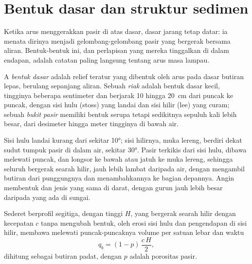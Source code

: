\section{Bentuk dasar dan struktur sedimen}\label{sec:b1:clastic-sediments:bedforms}

Ketika arus menggerakkan pasir di atas dasar, dasar jarang tetap datar: ia menata dirinya menjadi gelombang-gelombang pasir yang bergerak bersama aliran. Bentuk-bentuk ini, dan perlapisan yang mereka tinggalkan di dalam endapan, adalah catatan paling langsung tentang arus masa lampau.

\begin{definition}\label{def:b1:clastic-sediments:bedform}
A \emph{bentuk dasar} adalah relief teratur yang dibentuk oleh arus pada dasar butiran lepas, berulang sepanjang aliran. Sebuah \emph{riak} adalah bentuk dasar kecil, tingginya beberapa sentimeter dan berjarak 10 hingga \qty{20}{cm} dari puncak ke puncak, dengan sisi hulu (stoss) yang landai dan sisi hilir (lee) yang curam; sebuah \emph{bukit pasir} memiliki bentuk serupa tetapi sedikitnya sepuluh kali lebih besar, dari desimeter hingga meter tingginya di bawah air.
\end{definition}

Sisi hulu  landai kurang dari sekitar \ang{10}; sisi hilirnya, muka lereng, berdiri dekat sudut tumpuk pasir di dalam air, sekitar \ang{30}. Pasir terkikis dari sisi hulu, dibawa melewati puncak, dan longsor ke bawah atau jatuh ke muka lereng, sehingga seluruh  bergerak searah hilir, jauh lebih lambat daripada air, dengan mengambil butiran dari punggungnya dan menambahkannya ke bagian depannya. Angin membentuk  dan  jenis yang sama di darat, dengan  gurun jauh lebih besar daripada yang ada di sungai.

\begin{proposition}\label{prop:b1:clastic-sediments:migration}
Sederet  berprofil segitiga, dengan tinggi $H$, yang bergerak searah hilir dengan kecepatan $c$ tanpa mengubah bentuk, oleh erosi sisi hulu dan pengendapan di sisi hilir, membawa melewati puncak-puncaknya volume  per satuan lebar dan waktu
\[
  q_b = (1 - p)\,\frac{c\,H}{2},
\]
dihitung sebagai butiran padat, dengan $p$ adalah porositas pasir.
\end{proposition}

